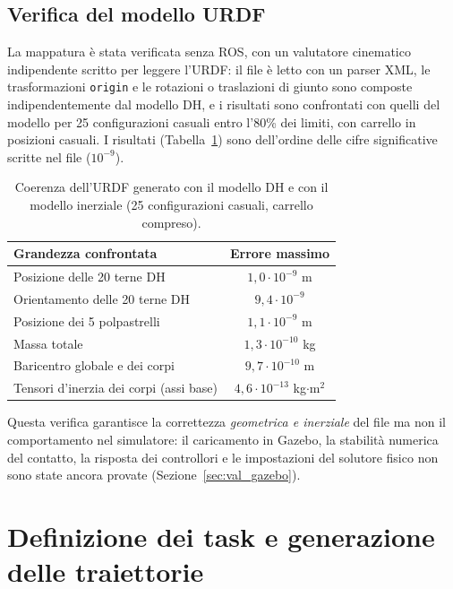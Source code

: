 \subsection{Verifica del modello URDF}

La mappatura è stata verificata senza ROS, con un valutatore cinematico indipendente scritto per leggere l'URDF: il file è letto con un parser XML, le trasformazioni \texttt{origin} e le rotazioni o traslazioni di giunto sono composte indipendentemente dal modello DH, e i risultati sono confrontati con quelli del modello per 25 configurazioni casuali entro l'80\% dei limiti, con carrello in posizioni casuali. I risultati (Tabella~\ref{tab:urdf_check}) sono dell'ordine delle cifre significative scritte nel file ($10^{-9}$).

\begin{table}[htbp]
    \centering
    \renewcommand{\arraystretch}{1.1}
    \begin{tabular}{|l|c|}
        \hline
        Grandezza confrontata & Errore massimo\\ \hline \hline
        Posizione delle 20 terne DH & $1{,}0\cdot10^{-9}$ m\\
        Orientamento delle 20 terne DH & $9{,}4\cdot10^{-9}$\\
        Posizione dei 5 polpastrelli & $1{,}1\cdot10^{-9}$ m\\
        Massa totale & $1{,}3\cdot10^{-10}$ kg\\
        Baricentro globale e dei corpi & $9{,}7\cdot10^{-10}$ m\\
        Tensori d'inerzia dei corpi (assi base) & $4{,}6\cdot10^{-13}$ kg$\cdot$m$^2$\\ \hline
    \end{tabular}
    \caption{Coerenza dell'URDF generato con il modello DH e con il modello inerziale (25 configurazioni casuali, carrello compreso).}
    \label{tab:urdf_check}
\end{table}

Questa verifica garantisce la correttezza \emph{geometrica e inerziale} del file ma non il comportamento nel simulatore: il caricamento in Gazebo, la stabilità numerica del contatto, la risposta dei controllori e le impostazioni del solutore fisico non sono state ancora provate (Sezione~\ref{sec:val_gazebo}).

\clearpage
\section{Definizione dei task e generazione delle traiettorie}
\label{sec:ik_tasks}

